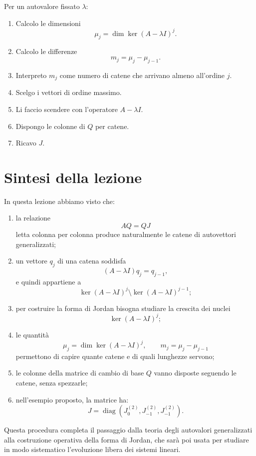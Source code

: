 Per un autovalore fissato $\lambda$:

\begin{enumerate}
    \item Calcolo le dimensioni
    \[
    \mu_j=\dim\ker(A-\lambda I)^j.
    \]
    \item Calcolo le differenze
    \[
    m_j=\mu_j-\mu_{j-1}.
    \]
    \item Interpreto $m_j$ come numero di catene che arrivano almeno all'ordine $j$.
    \item Scelgo i vettori di ordine massimo.
    \item Li faccio scendere con l'operatore $A-\lambda I$.
    \item Dispongo le colonne di $Q$ per catene.
    \item Ricavo $J$.
\end{enumerate}

\section{Sintesi della lezione}

In questa lezione abbiamo visto che:

\begin{enumerate}
    \item la relazione
    \[
    AQ=QJ
    \]
    letta colonna per colonna produce naturalmente le catene di autovettori generalizzati;

    \item un vettore $q_j$ di una catena soddisfa
    \[
    (A-\lambda I)q_j=q_{j-1},
    \]
    e quindi appartiene a
    \[
    \ker(A-\lambda I)^j\setminus \ker(A-\lambda I)^{j-1};
    \]

    \item per costruire la forma di Jordan bisogna studiare la crescita dei nuclei
    \[
    \ker(A-\lambda I)^j;
    \]

    \item le quantità
    \[
    \mu_j=\dim\ker(A-\lambda I)^j,
    \qquad
    m_j=\mu_j-\mu_{j-1}
    \]
    permettono di capire quante catene e di quali lunghezze servono;

    \item le colonne della matrice di cambio di base $Q$ vanno disposte seguendo le catene, senza spezzarle;

    \item nell'esempio proposto, la matrice ha:
    \[
    J=\operatorname{diag}\!\left(J_0^{(2)},J_{-1}^{(2)},J_{-1}^{(2)}\right).
    \]
\end{enumerate}

Questa procedura completa il passaggio dalla teoria degli autovalori generalizzati alla costruzione operativa della forma di Jordan, che sarà poi usata per studiare in modo sistematico l'evoluzione libera dei sistemi lineari.
